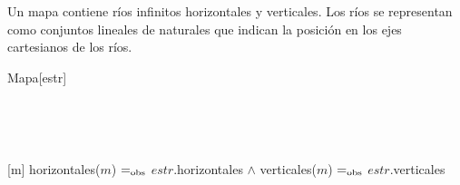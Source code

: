 \begin{Representacion}
  
  
    Un mapa contiene ríos infinitos horizontales y verticales. Los ríos se
    representan como conjuntos lineales de naturales que indican la posición en
    los ejes cartesianos de los ríos.
  
    \begin{Estructura}{Mapa}[estr]
      \begin{Tupla}[estr]
      \end{Tupla}
  
    \end{Estructura}
    
    ~ 

  
    ~ 
  
    [m]{
        horizontales($m$) $=_{\mathrm{obs}}$ $estr$.horizontales $\land$ 
        verticales($m$) $=_{\mathrm{obs}}$ $estr$.verticales 
    }
  
  \end{Representacion}